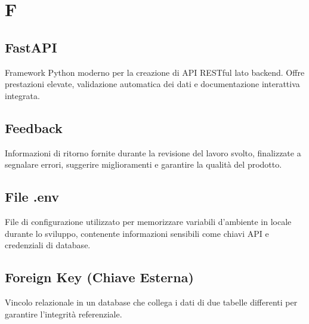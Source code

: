 \documentclass[a4paper, 11pt, oneside]{scrartcl} %
\begin{document}

\section*{F}


\subsection*{FastAPI}


Framework Python moderno per la creazione di API RESTful lato backend. Offre prestazioni elevate, validazione automatica dei dati e documentazione interattiva integrata.

\vspace{0.5cm}

\subsection*{Feedback}


Informazioni di ritorno fornite durante la revisione del lavoro svolto, finalizzate a segnalare errori, suggerire miglioramenti e garantire la qualità del prodotto.

\vspace{0.5cm}

\subsection*{File .env}


File di configurazione utilizzato per memorizzare variabili d'ambiente in locale durante lo sviluppo, contenente informazioni sensibili come chiavi API e credenziali di database.

\vspace{0.5cm}

\subsection*{Foreign Key (Chiave Esterna)}
Vincolo relazionale in un database che collega i dati di due tabelle differenti per garantire l'integrità referenziale.
\vspace{0.5cm}
\end{document}
